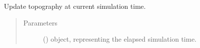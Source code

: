 \documentclass[letterpaper,10pt,english]{sphinxmanual}
\begin{document}
\begin{fulllineitems}
\begin{fulllineitems}
\begin{quote}
\begin{description}
\begin{itemize}
\end{itemize}

\end{description}\end{quote}

\end{fulllineitems}


\begin{fulllineitems}
\label{\detokenize{api:grids.topography.Topography1d.update}}
Update topography at current simulation time.
\begin{quote}\begin{description}
\item[{Parameters}] \leavevmode
{} () \textendash{}  object, representing the elapsed simulation time.

\end{description}\end{quote}

\end{fulllineitems}


\end{fulllineitems}

\end{document}
